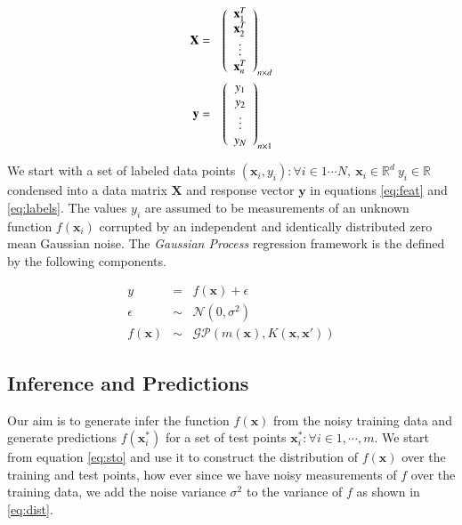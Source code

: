\documentclass[referee,a4paper,12pt,traditabstract]{swsc}
\begin{document}
\begin{linenumbers}
\begin{eqnarray}
  \mathbf{X} & = & \left( \begin{array}{c} \mathbf{x}^{T}_1 \\ \mathbf{x}^{T}_2 \\ \vdots \\ \mathbf{x}^{T}_n \end{array} \right)_{n \times d} \label{eq:feat} \\
  \vspace{2\baselineskip}
  \mathbf{y} & = & \left( \begin{array}{c} y_1 \\ y_2 \\ \vdots \\ y_N \end{array} \right) _{n \times 1} \label{eq:labels}
\end{eqnarray}

We start with a set of labeled data points $ {(\mathbf{x}_i, y_i): \forall i \in 1 \cdots N, \ \mathbf{x}_i \in \mathbb{R}^d \ y_i \in \mathbb{R}} $ condensed into a data matrix $\mathbf{X}$ and response vector $\mathbf{y}$ in equations \ref{eq:feat} and \ref{eq:labels}. The values $y_i$ are assumed to be measurements of an unknown function $f(\mathbf{x}_i)$ corrupted by an independent and identically distributed zero mean Gaussian noise. The \emph{Gaussian Process} regression framework is the defined by the following components.

\begin{eqnarray}
      y & = & f(\mathbf{x}) + \epsilon  \\
      \epsilon & \sim & \mathcal{N}(0, \sigma^2) \\
      f(\mathbf{x}) & \sim & \mathcal{GP}(m(\mathbf{x}), K(\mathbf{x},\mathbf{x}')) 
\end{eqnarray}


\subsection{Inference and Predictions} \label{sec:inference}

Our aim is to generate infer the function $f(\mathbf{x})$ from the noisy training data and generate predictions $f(\mathbf{x}^{*}_i)$ for a set of test points $ {\mathbf{x}^{*}_i : \forall i \in 1, \cdots, m} $. We start from equation \ref{eq:sto} and use it to construct the distribution of $f(\mathbf{x})$ over the training and test points, how ever since we have noisy measurements of $f$ over the training data, we add the noise variance $\sigma^2$ to the variance of $f$ as shown in \ref{eq:dist}.


\end{linenumbers}
\end{document}
